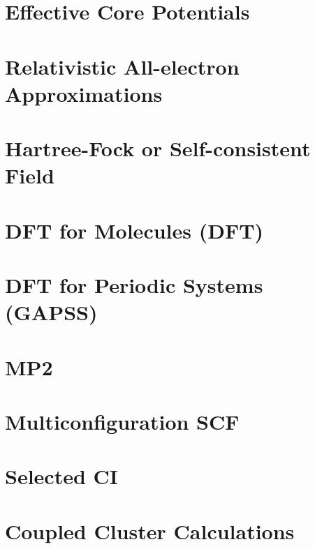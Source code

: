 \chapter{Effective Core Potentials}


\chapter{Relativistic All-electron Approximations}


\chapter{Hartree-Fock or Self-consistent Field} 


\chapter{DFT for Molecules (DFT)}


\chapter{DFT for Periodic Systems (GAPSS)}


\chapter{MP2}


\chapter{Multiconfiguration SCF}


\chapter{Selected CI}


\chapter{Coupled Cluster Calculations}


%



